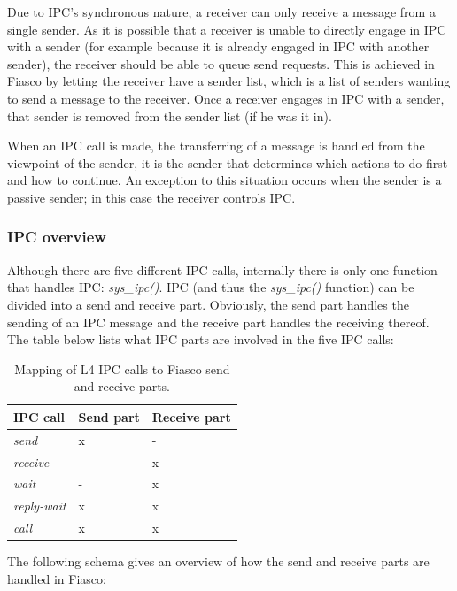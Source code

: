 Due to IPC's synchronous nature, a receiver can only receive a message from a single sender. As it is possible that a receiver is unable to directly engage in IPC with a sender (for example because it is already engaged in IPC with another sender), the receiver should be able to queue send requests. This is achieved in Fiasco by letting the receiver have a sender list, which is a list of senders wanting to send a message to the receiver. Once a receiver engages in IPC with a sender, that sender is removed from the sender list (if he was it in).\emptyline

When an IPC call is made, the transferring of a message is handled from the viewpoint of the sender, it is the sender that determines which actions to do first and how to continue. An exception to this situation occurs when the sender is a passive sender; in this case the receiver controls IPC.

\subsubsection{IPC overview}
Although there are five different IPC calls, internally there is only one function that handles IPC: \emph{sys\_ipc()}. IPC (and thus the \emph{sys\_ipc()} function) can be divided into a send and receive part. Obviously, the send part handles the sending of an IPC message and the receive part handles the receiving thereof. The table below lists what IPC parts are involved in the five IPC calls:

\begin{table}[ht]
\begin{tabular}{l|l|p{20em}}
IPC call & Send part & Receive part \\
\hline
\emph{send} & x & - \\
\emph{receive} & - & x \\
\emph{wait} & - & x \\
\emph{reply-wait} & x & x \\
\emph{call} & x & x \\
\end{tabular}
\caption{Mapping of L4 IPC calls to Fiasco send and receive parts.}
\end{table}

The following schema gives an overview of how the send and receive parts are handled in Fiasco:

